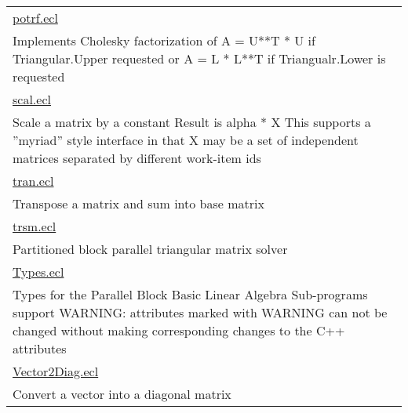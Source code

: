 {\begin{longtable}{|p{\textwidth}|}
\hyperlink{ecldoc:toc:PBblas.potrf}{potrf.ecl} \\
Implements Cholesky factorization of A = U**T * U if Triangular.Upper requested or A = L * L**T if Triangualr.Lower is requested \\
\hline
\hyperlink{ecldoc:toc:PBblas.scal}{scal.ecl} \\
Scale a matrix by a constant Result is alpha * X This supports a ''myriad'' style interface in that X may be a set of independent matrices separated by different work-item ids \\
\hline
\hyperlink{ecldoc:toc:PBblas.tran}{tran.ecl} \\
Transpose a matrix and sum into base matrix \\
\hline
\hyperlink{ecldoc:toc:PBblas.trsm}{trsm.ecl} \\
Partitioned block parallel triangular matrix solver \\
\hline
\hyperlink{ecldoc:toc:PBblas.Types}{Types.ecl} \\
Types for the Parallel Block Basic Linear Algebra Sub-programs support WARNING: attributes marked with WARNING can not be changed without making corresponding changes to the C++ attributes \\
\hline
\hyperlink{ecldoc:toc:PBblas.Vector2Diag}{Vector2Diag.ecl} \\
Convert a vector into a diagonal matrix \\
\hline
\end{longtable}
}


















